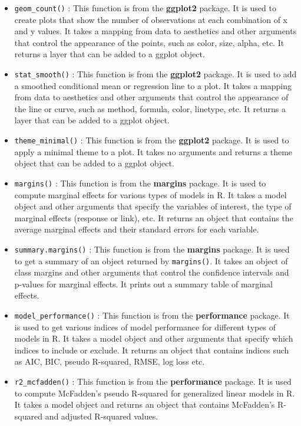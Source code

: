 \documentclass[
]{book}
\begin{document}
\begin{itemize}
\item
  \texttt{geom\_count()} : This function is from the \textbf{ggplot2} package. It is used to create plots that show the number of observations at each combination of x and y values. It takes a mapping from data to aesthetics and other arguments that control the appearance of the points, such as color, size, alpha, etc. It returns a layer that can be added to a ggplot object.
\item
  \texttt{stat\_smooth()} : This function is from the \textbf{ggplot2} package. It is used to add a smoothed conditional mean or regression line to a plot. It takes a mapping from data to aesthetics and other arguments that control the appearance of the line or curve, such as method, formula, color, linetype, etc. It returns a layer that can be added to a ggplot object.
\item
  \texttt{theme\_minimal()} : This function is from the \textbf{ggplot2} package. It is used to apply a minimal theme to a plot. It takes no arguments and returns a theme object that can be added to a ggplot object.
\item
  \texttt{margins()} : This function is from the \textbf{margins} package. It is used to compute marginal effects for various types of models in R. It takes a model object and other arguments that specify the variables of interest, the type of marginal effects (response or link), etc. It returns an object that contains the average marginal effects and their standard errors for each variable.
\item
  \texttt{summary.margins()} : This function is from the \textbf{margins} package. It is used to get a summary of an object returned by \texttt{margins()}. It takes an object of class margins and other arguments that control the confidence intervals and p-values for marginal effects. It prints out a summary table of marginal effects.
\item
  \texttt{model\_performance()} : This function is from the \textbf{performance} package. It is used to get various indices of model performance for different types of models in R. It takes a model object and other arguments that specify which indices to include or exclude. It returns an object that contains indices such as AIC, BIC, pseudo R-squared, RMSE, log loss etc.
\item
  \texttt{r2\_mcfadden()} : This function is from the \textbf{performance} package. It is used to compute McFadden's pseudo R-squared for generalized linear models in R. It takes a model object and returns an object that contains McFadden's R-squared and adjusted R-squared values.

\end{itemize}
\end{document}
